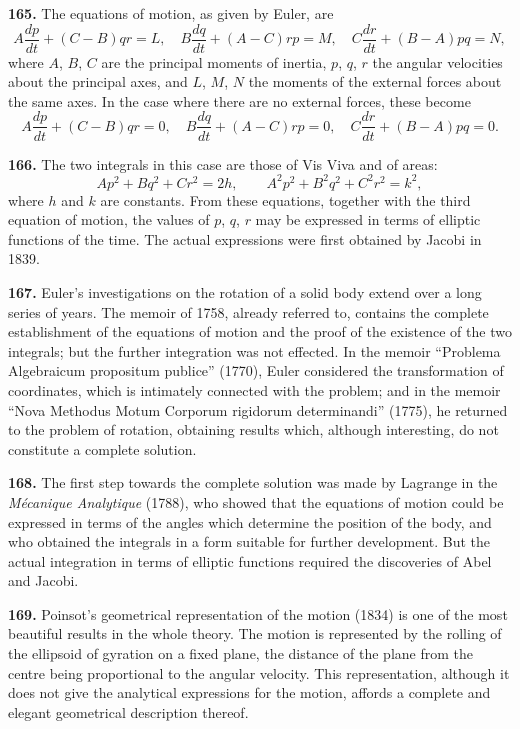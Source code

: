 \documentclass[11pt,a4paper]{article}
\theoremstyle{definition}
\begin{document}
\textbf{165.} The equations of motion, as given by Euler, are
\[
A\frac{dp}{dt} + (C - B)qr = L, \quad B\frac{dq}{dt} + (A - C)rp = M, \quad C\frac{dr}{dt} + (B - A)pq = N,
\]
where $A$, $B$, $C$ are the principal moments of inertia, $p$, $q$, $r$ the angular velocities about the principal axes, and $L$, $M$, $N$ the moments of the external forces about the same axes. In the case where there are no external forces, these become
\[
A\frac{dp}{dt} + (C - B)qr = 0, \quad B\frac{dq}{dt} + (A - C)rp = 0, \quad C\frac{dr}{dt} + (B - A)pq = 0.
\]

\textbf{166.} The two integrals in this case are those of Vis Viva and of areas:
\[
Ap^2 + Bq^2 + Cr^2 = 2h, \qquad A^2p^2 + B^2q^2 + C^2r^2 = k^2,
\]
where $h$ and $k$ are constants. From these equations, together with the third equation of motion, the values of $p$, $q$, $r$ may be expressed in terms of elliptic functions of the time. The actual expressions were first obtained by Jacobi in 1839.

\textbf{167.} Euler's investigations on the rotation of a solid body extend over a long series of years. The memoir of 1758, already referred to, contains the complete establishment of the equations of motion and the proof of the existence of the two integrals; but the further integration was not effected. In the memoir ``Problema Algebraicum propositum publice'' (1770), Euler considered the transformation of coordinates, which is intimately connected with the problem; and in the memoir ``Nova Methodus Motum Corporum rigidorum determinandi'' (1775), he returned to the problem of rotation, obtaining results which, although interesting, do not constitute a complete solution.

\textbf{168.} The first step towards the complete solution was made by Lagrange in the \textit{M\'ecanique Analytique} (1788), who showed that the equations of motion could be expressed in terms of the angles which determine the position of the body, and who obtained the integrals in a form suitable for further development. But the actual integration in terms of elliptic functions required the discoveries of Abel and Jacobi.

\textbf{169.} Poinsot's geometrical representation of the motion (1834) is one of the most beautiful results in the whole theory. The motion is represented by the rolling of the ellipsoid of gyration on a fixed plane, the distance of the plane from the centre being proportional to the angular velocity. This representation, although it does not give the analytical expressions for the motion, affords a complete and elegant geometrical description thereof.
\end{document}
